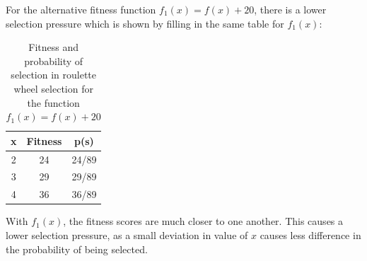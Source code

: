 \documentclass{article}
\begin{document}
For the alternative fitness function $f_1 (x) = f (x) + 20$, there is a lower selection pressure which is shown by filling in the same table for $f_1(x)$:
\begin{table}[]
    \centering
    \begin{tabular}{c|c|c}
    x    & Fitness  & p(s) \\ \hline \hline
    2    &  24      & 24/89 \\ \hline
    3    &  29      & 29/89\\ \hline
    4    &  36      & 36/89 \\    
    \end{tabular}
    \caption{Fitness and probability of selection in roulette wheel selection for the function $f_1(x)=f(x)+20$}
\end{table}
With $f_1(x)$, the fitness scores are much closer to one another. This causes a lower selection pressure, as a small deviation in value of $x$ causes less difference in the probability of being selected.

\end{document}
